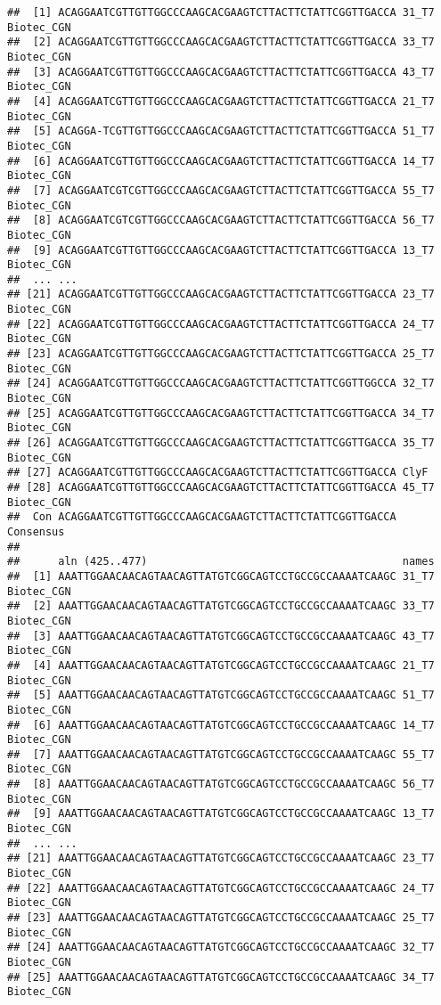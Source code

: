 \documentclass[
]{article}
\begin{document}
\begin{verbatim}
##  [1] ACAGGAATCGTTGTTGGCCCAAGCACGAAGTCTTACTTCTATTCGGTTGACCA 31_T7 Biotec_CGN
##  [2] ACAGGAATCGTTGTTGGCCCAAGCACGAAGTCTTACTTCTATTCGGTTGACCA 33_T7 Biotec_CGN
##  [3] ACAGGAATCGTTGTTGGCCCAAGCACGAAGTCTTACTTCTATTCGGTTGACCA 43_T7 Biotec_CGN
##  [4] ACAGGAATCGTTGTTGGCCCAAGCACGAAGTCTTACTTCTATTCGGTTGACCA 21_T7 Biotec_CGN
##  [5] ACAGGA-TCGTTGTTGGCCCAAGCACGAAGTCTTACTTCTATTCGGTTGACCA 51_T7 Biotec_CGN
##  [6] ACAGGAATCGTTGTTGGCCCAAGCACGAAGTCTTACTTCTATTCGGTTGACCA 14_T7 Biotec_CGN
##  [7] ACAGGAATCGTCGTTGGCCCAAGCACGAAGTCTTACTTCTATTCGGTTGACCA 55_T7 Biotec_CGN
##  [8] ACAGGAATCGTCGTTGGCCCAAGCACGAAGTCTTACTTCTATTCGGTTGACCA 56_T7 Biotec_CGN
##  [9] ACAGGAATCGTTGTTGGCCCAAGCACGAAGTCTTACTTCTATTCGGTTGACCA 13_T7 Biotec_CGN 
##  ... ...
## [21] ACAGGAATCGTTGTTGGCCCAAGCACGAAGTCTTACTTCTATTCGGTTGACCA 23_T7 Biotec_CGN
## [22] ACAGGAATCGTTGTTGGCCCAAGCACGAAGTCTTACTTCTATTCGGTTGACCA 24_T7 Biotec_CGN
## [23] ACAGGAATCGTTGTTGGCCCAAGCACGAAGTCTTACTTCTATTCGGTTGACCA 25_T7 Biotec_CGN
## [24] ACAGGAATCGTTGTTGGCCCAAGCACGAAGTCTTACTTCTATTCGGTTGGCCA 32_T7 Biotec_CGN
## [25] ACAGGAATCGTTGTTGGCCCAAGCACGAAGTCTTACTTCTATTCGGTTGACCA 34_T7 Biotec_CGN
## [26] ACAGGAATCGTTGTTGGCCCAAGCACGAAGTCTTACTTCTATTCGGTTGACCA 35_T7 Biotec_CGN
## [27] ACAGGAATCGTTGTTGGCCCAAGCACGAAGTCTTACTTCTATTCGGTTGACCA ClyF
## [28] ACAGGAATCGTTGTTGGCCCAAGCACGAAGTCTTACTTCTATTCGGTTGACCA 45_T7 Biotec_CGN
##  Con ACAGGAATCGTTGTTGGCCCAAGCACGAAGTCTTACTTCTATTCGGTTGACCA Consensus 
## 
##      aln (425..477)                                        names
##  [1] AAATTGGAACAACAGTAACAGTTATGTCGGCAGTCCTGCCGCCAAAATCAAGC 31_T7 Biotec_CGN
##  [2] AAATTGGAACAACAGTAACAGTTATGTCGGCAGTCCTGCCGCCAAAATCAAGC 33_T7 Biotec_CGN
##  [3] AAATTGGAACAACAGTAACAGTTATGTCGGCAGTCCTGCCGCCAAAATCAAGC 43_T7 Biotec_CGN
##  [4] AAATTGGAACAACAGTAACAGTTATGTCGGCAGTCCTGCCGCCAAAATCAAGC 21_T7 Biotec_CGN
##  [5] AAATTGGAACAACAGTAACAGTTATGTCGGCAGTCCTGCCGCCAAAATCAAGC 51_T7 Biotec_CGN
##  [6] AAATTGGAACAACAGTAACAGTTATGTCGGCAGTCCTGCCGCCAAAATCAAGC 14_T7 Biotec_CGN
##  [7] AAATTGGAACAACAGTAACAGTTATGTCGGCAGTCCTGCCGCCAAAATCAAGC 55_T7 Biotec_CGN
##  [8] AAATTGGAACAACAGTAACAGTTATGTCGGCAGTCCTGCCGCCAAAATCAAGC 56_T7 Biotec_CGN
##  [9] AAATTGGAACAACAGTAACAGTTATGTCGGCAGTCCTGCCGCCAAAATCAAGC 13_T7 Biotec_CGN 
##  ... ...
## [21] AAATTGGAACAACAGTAACAGTTATGTCGGCAGTCCTGCCGCCAAAATCAAGC 23_T7 Biotec_CGN
## [22] AAATTGGAACAACAGTAACAGTTATGTCGGCAGTCCTGCCGCCAAAATCAAGC 24_T7 Biotec_CGN
## [23] AAATTGGAACAACAGTAACAGTTATGTCGGCAGTCCTGCCGCCAAAATCAAGC 25_T7 Biotec_CGN
## [24] AAATTGGAACAACAGTAACAGTTATGTCGGCAGTCCTGCCGCCAAAATCAAGC 32_T7 Biotec_CGN
## [25] AAATTGGAACAACAGTAACAGTTATGTCGGCAGTCCTGCCGCCAAAATCAAGC 34_T7 Biotec_CGN

\end{verbatim}
\end{document}
